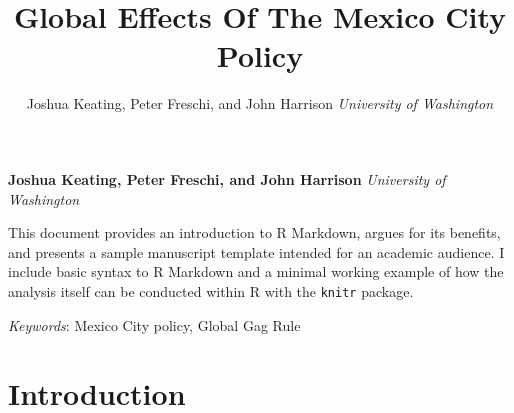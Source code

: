 \documentclass[11pt,]{article}
\title{Global Effects Of The Mexico City Policy  }
\author{\Large Joshua Keating, Peter Freschi, and John Harrison\vspace{0.05in} \newline\normalsize\emph{University of Washington}  }
\date{}
\newcommand*{\authorfont}{\fontfamily{phv}\selectfont}
\renewenvironment{abstract}
 {{%
    \setlength{\leftmargin}{0mm}
    \setlength{\rightmargin}{\leftmargin}%
  }%
  \relax}
 {\endlist}
\begin{document}
	
%

{%
\setlength{\parindent}{0pt}
\thispagestyle{plain}
{\fontsize{18}{20}\selectfont\raggedright 
\maketitle  %

}

{
   \vskip 13.5pt\relax \normalsize\fontsize{11}{12} 
\textbf{\authorfont Joshua Keating, Peter Freschi, and John Harrison} \hskip 15pt \emph{\small University of Washington}   

}

}







\begin{abstract}

    \hbox{\vrule height .2pt width 39.14pc}

    \vskip 8.5pt %

\noindent This document provides an introduction to R Markdown, argues for its
benefits, and presents a sample manuscript template intended for an
academic audience. I include basic syntax to R Markdown and a minimal
working example of how the analysis itself can be conducted within R
with the \texttt{knitr} package.


\vskip 8.5pt \noindent \emph{Keywords}: Mexico City policy, Global Gag Rule \par

    \hbox{\vrule height .2pt width 39.14pc}



\end{abstract}


\vskip 6.5pt

\noindent  \section{Introduction}\label{introduction}
\end{document}
